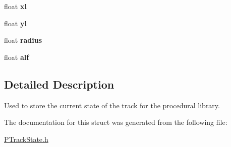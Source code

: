 \begin{DoxyCompactItemize}
\item 
\hypertarget{structprocedural_1_1_p_track_state_a4d1953df3b5601e2bce518362030bd2b}{float {\bfseries xl}}\label{structprocedural_1_1_p_track_state_a4d1953df3b5601e2bce518362030bd2b}

\item 
\hypertarget{structprocedural_1_1_p_track_state_a2d9bec4da99d9fd379cd4d3f21c25963}{float {\bfseries yl}}\label{structprocedural_1_1_p_track_state_a2d9bec4da99d9fd379cd4d3f21c25963}

\item 
\hypertarget{structprocedural_1_1_p_track_state_a6781ec7009fe16644eefc244f51a1414}{float {\bfseries radius}}\label{structprocedural_1_1_p_track_state_a6781ec7009fe16644eefc244f51a1414}

\item 
\hypertarget{structprocedural_1_1_p_track_state_a52fa96c22ec053a3b2d48f5195e2cda8}{float {\bfseries alf}}\label{structprocedural_1_1_p_track_state_a52fa96c22ec053a3b2d48f5195e2cda8}

\end{DoxyCompactItemize}


\subsection{Detailed Description}
Used to store the current state of the track for the procedural library. 

The documentation for this struct was generated from the following file\-:\begin{DoxyCompactItemize}
\item 
\hyperlink{_p_track_state_8h}{P\-Track\-State.\-h}\end{DoxyCompactItemize}
